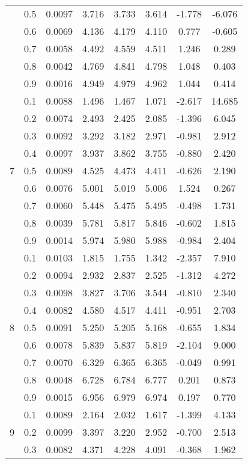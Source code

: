\documentclass[11pt,a4paper]{report}
\begin{document}
\begin{longtable}{ | c | c || c | c | c | c | c | c | }
 & 0.5 & 0.0097 & 3.716 & 3.733 & 3.614 & -1.778 & -6.076 \\
 & 0.6 & 0.0069 & 4.136 & 4.179 & 4.110 & 0.777 & -0.605 \\
 & 0.7 & 0.0058 & 4.492 & 4.559 & 4.511 & 1.246 & 0.289 \\
 & 0.8 & 0.0042 & 4.769 & 4.841 & 4.798 & 1.048 & 0.403 \\
 & 0.9 & 0.0016 & 4.949 & 4.979 & 4.962 & 1.044 & 0.414 \\
 \hline
\multirow{9}{*}{7} & 0.1 & 0.0088 & 1.496 & 1.467 & 1.071 & -2.617 & 14.685 \\
 & 0.2 & 0.0074 & 2.493 & 2.425 & 2.085 & -1.396 & 6.045 \\
 & 0.3 & 0.0092 & 3.292 & 3.182 & 2.971 & -0.981 & 2.912 \\
 & 0.4 & 0.0097 & 3.937 & 3.862 & 3.755 & -0.880 & 2.420 \\
 & 0.5 & 0.0089 & 4.525 & 4.473 & 4.411 & -0.626 & 2.190 \\
 & 0.6 & 0.0076 & 5.001 & 5.019 & 5.006 & 1.524 & 0.267 \\
 & 0.7 & 0.0060 & 5.448 & 5.475 & 5.495 & -0.498 & 1.731 \\
 & 0.8 & 0.0039 & 5.781 & 5.817 & 5.846 & -0.602 & 1.815 \\
 & 0.9 & 0.0014 & 5.974 & 5.980 & 5.988 & -0.984 & 2.404 \\
 \hline
\multirow{9}{*}{8} & 0.1 & 0.0103 & 1.815 & 1.755 & 1.342 & -2.357 & 7.910 \\
 & 0.2 & 0.0094 & 2.932 & 2.837 & 2.525 & -1.312 & 4.272 \\
 & 0.3 & 0.0098 & 3.827 & 3.706 & 3.544 & -0.810 & 2.340 \\
 & 0.4 & 0.0082 & 4.580 & 4.517 & 4.411 & -0.951 & 2.703 \\
 & 0.5 & 0.0091 & 5.250 & 5.205 & 5.168 & -0.655 & 1.834 \\
 & 0.6 & 0.0078 & 5.839 & 5.837 & 5.819 & -2.104 & 9.000 \\
 & 0.7 & 0.0070 & 6.329 & 6.365 & 6.365 & -0.049 & 0.991 \\
 & 0.8 & 0.0048 & 6.728 & 6.784 & 6.777 & 0.201 & 0.873 \\
 & 0.9 & 0.0015 & 6.956 & 6.979 & 6.974 & 0.197 & 0.770 \\
 \hline
\multirow{9}{*}{9} & 0.1 & 0.0089 & 2.164 & 2.032 & 1.617 & -1.399 & 4.133 \\
 & 0.2 & 0.0099 & 3.397 & 3.220 & 2.952 & -0.700 & 2.513 \\
 & 0.3 & 0.0082 & 4.371 & 4.228 & 4.091 & -0.368 & 1.962 \\

\end{longtable}
\end{document}
